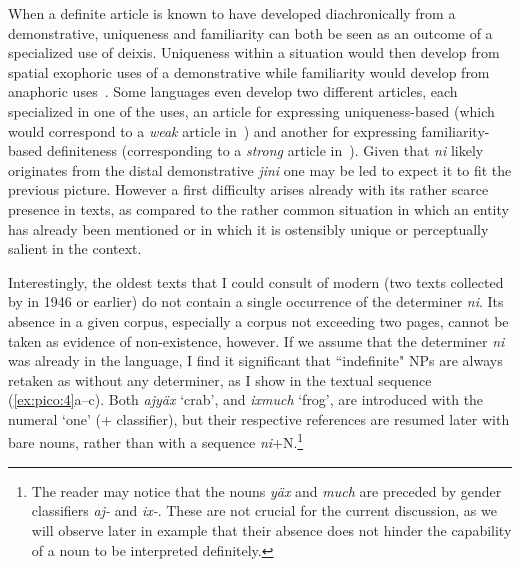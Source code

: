 \documentclass[output=paper
,modfonts
,nonflat]{langsci/langscibook}
\begin{document}
When a definite article is known to have developed diachronically from a demonstrative, uniqueness and familiarity can both be seen as an outcome of a specialized use of deixis. Uniqueness within a situation would then develop from spatial exophoric uses of a demonstrative while familiarity would develop from anaphoric uses~\citep[there is some discussion about whether one use is more fundamental, see][160]{Lyons1999}.
Some languages even develop two different articles, each specialized in one of the uses, an article for expressing uniqueness-based  (which would correspond to a \textit{weak} article in~\citealt{Schwarz2013}) and another for expressing familiarity-based definiteness (corresponding to a \textit{strong} article in~\citealt{Schwarz2013}). Given that \textit{ni} likely originates from the distal demonstrative \textit{jini} one may be led to expect it to fit the previous picture. However a first difficulty arises already with its rather scarce presence in texts, as compared to the rather common situation in which an entity has already been mentioned or in which it is ostensibly unique or perceptually salient in the context.

Interestingly, the oldest texts that I could consult of modern  (two texts collected by \citeauthor{KellerHarris1946} in 1946 or earlier) do not contain a single occurrence of the determiner \textit{ni}. Its absence in a given corpus, especially a corpus not exceeding two pages, cannot be taken as evidence of non-existence, however. If we assume that the determiner \textit{ni} was already in the language, I find it significant that ``indefinite" NPs are always retaken as  without any determiner, as I show in the textual sequence (\ref{ex:pico:4}a--c). Both \textit{ajy\"ax} `crab', and \textit{ixmuch} `frog', are introduced with the numeral `one' (+ classifier), but their respective references are resumed later with bare nouns, rather than with a sequence \textit{ni}+N.\footnote{The reader may notice that the nouns \textit{y\"ax} and \textit{much} are preceded by gender classifiers \textit{aj-} and \textit{ix-}. These are not crucial for the current discussion, as we will observe later in example  that their absence does not hinder the capability of a noun to be interpreted definitely.}
\end{document}
